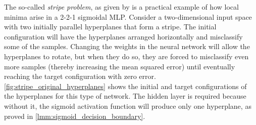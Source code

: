 The so-called \textit{stripe problem}, as given by \textcite{weir2019} is a practical example of how local minima arise in a 2-2-1 sigmoidal MLP.
Consider a two-dimensional input space with two initially parallel hyperplanes that form a stripe.
The initial configuration will have the hyperplanes arranged horizontally and misclassify some of the samples. 
Changing the weights in the neural network will allow the hyperplanes to rotate, but when they do so, they are forced to misclassify even more samples (thereby increasing the mean squared error) until eventually reaching the target configuration with zero error.
\ref{fig:stripe_original_hyperplanes} shows the initial and target configurations of the hyperplanes for this type of network.
The hidden layer is required because without it, the sigmoid activation function will produce only one hyperplane, as proved in \ref{lmm:sigmoid_decision_boundary}.

